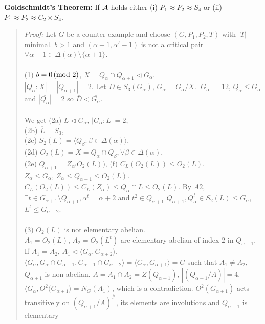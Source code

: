 {\bf Goldschmidt's Theorem:}
If ${\cal A}$ holds either (i) $P_1 \approx P_2 \approx S_4$ or (ii) $P_1 \approx P_2 \approx C_2 \times S_4$.
\begin{quote}
\emph{Proof:}  Let $G$ be a counter example and choose $(G, P_1, P_2, T)$ with $|T|$ minimal.
$b > 1$ and $(\alpha - 1, \alpha' - 1)$ is not a critical pair $\forall \alpha - 1 \in \Delta(\alpha) \setminus \{\alpha + 1 \}$.
\\
\\
(1) $b = 0 \thinspace \textnormal{(mod } 2 \textnormal{)}$, $X = Q_{\alpha} \cap Q_{\alpha + 1} \lhd G_{\alpha}$.
\\
$|Q_{\alpha} : X| = |Q_{\alpha + 1}| = 2$.  Let $D \in S_3(G_{\alpha})$, ${\overline {G_{\alpha}}} = G_{\alpha} / X$.
$|{\overline {G_{\alpha}}}|= 12$, ${\overline {Q_{\alpha}}} \leq {\overline {G_{\alpha}}}$ and $|{\overline {Q_{\alpha}}}|=2$ so
${\overline D} \lhd {\overline {G_{\alpha}}}$.\\
\\
We get (2a) $L \lhd G_{\alpha}$, $|G_{\alpha}:L| = 2$,\\
(2b) ${\overline L} = S_3$, \\
(2c) $S_2(L) = \langle Q_{\beta}: \beta \in \Delta(\alpha)\rangle$,\\
(2d) $O_2(L) = X = Q_{\alpha} \cap Q_{\beta}, \forall \beta \in \Delta(\alpha)$,\\
(2e) $Q_{\alpha +1} = Z_{\alpha'} O_2(L))$, (f) $C_L(O_2(L)) \leq O_2(L)$.\\
$Z_{\alpha} \leq G_{\alpha}$, $Z_{\alpha} \leq Q_{\alpha + 1} \leq O_2(L)$.
$C_L(O_2(L)) \leq C_L(Z_{\alpha}) \leq Q_{\alpha} \cap L \leq O_2(L)$.
By $A2$, $\exists t \in G_{\alpha + 1} \setminus Q_{\alpha + 1}, \alpha^t = \alpha + 2$ and $t^2 \in Q_{\alpha + 1}$
$Q_{\alpha + 1}, Q_{\alpha}^t \in S_2(L) \leq G_{\alpha}$, $L^t \leq G_{\alpha + 2}$. \\
\\
(3) $O_2(L)$ is not elementary abelian.
\\
$A_1 = O_2(L)$, $A_2=O_2(L^t)$ are elementary abelian of index $2$ in $Q_{\alpha + 1}$.
If $A_1 = A_2$, $A_1 \lhd \langle G_{\alpha}, G_{\alpha + 2}\rangle$.
$\langle G_{\alpha}, G_{\alpha} \cap  G_{\alpha + 1}, G_{\alpha + 1} \cap  G_{\alpha + 2}\rangle = \langle G_{\alpha}, G_{\alpha + 1}\rangle=G$
such that $A_1 \ne A_2$, $Q_{\alpha + 1}$ is non-abelian.
$A = A_1 \cap A_2 = Z(Q_{\alpha + 1})$, $|(Q_{\alpha + 1}/A)| = 4$.
$\langle G_{\alpha}, O^2(G_{\alpha + 1} \rangle = N_G(A_1)$, which is a contradiction.
$O^2(G_{\alpha + 1})$ acts transitively on $(Q_{\alpha + 1}/A)^{\#}$, its elements are involutions and $Q_{\alpha + 1}$ is elementary

\end{quote}
